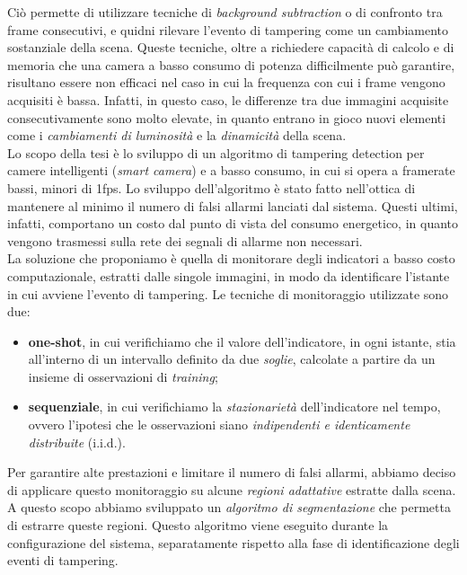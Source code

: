 Ci\`o permette di utilizzare tecniche di \textit{background subtraction} o di confronto tra frame consecutivi, e quidni rilevare l'evento di tampering come un cambiamento sostanziale della scena.
Queste tecniche, oltre a richiedere capacit\`a di calcolo e di memoria che una camera a basso consumo di potenza difficilmente pu\`o garantire, risultano essere non efficaci nel caso in cui la frequenza con cui i frame vengono acquisiti \`e bassa.
Infatti, in questo caso, le differenze tra due immagini acquisite consecutivamente sono molto elevate, in quanto entrano in gioco nuovi elementi come i \textit{cambiamenti di luminosit\`a} e la \textit{dinamicit\`a} della scena.\\
Lo scopo della tesi \`e lo sviluppo di un algoritmo di tampering detection per camere intelligenti (\textit{smart camera}) e a basso consumo, in cui si opera a framerate bassi, minori di 1fps.
Lo sviluppo dell'algoritmo \`e stato fatto nell'ottica di mantenere al minimo il numero di falsi allarmi lanciati dal sistema.
Questi ultimi, infatti, comportano un costo dal punto di vista del consumo energetico, in quanto vengono trasmessi sulla rete dei segnali di allarme non necessari.\\
La soluzione che proponiamo \`e quella di monitorare degli indicatori a basso costo computazionale, estratti dalle singole immagini, in modo da identificare l'istante in cui avviene l'evento di tampering.
Le tecniche di monitoraggio utilizzate sono due:
\begin{itemize}
	\item \textbf{one-shot}, in cui verifichiamo che il valore dell'indicatore, in ogni istante, stia all'interno di un intervallo definito da due \textit{soglie}, calcolate a partire da un insieme di osservazioni di \textit{training};
	\item \textbf{sequenziale}, in cui verifichiamo la \textit{stazionariet\`a} dell'indicatore nel tempo, ovvero l'ipotesi che le osservazioni siano \textit{indipendenti e identicamente distribuite} (i.i.d.).
\end{itemize}
Per garantire alte prestazioni e limitare il numero di falsi allarmi, abbiamo deciso di applicare questo monitoraggio su alcune \textit{regioni adattative} estratte dalla scena.
A questo scopo abbiamo sviluppato un \textit{algoritmo di segmentazione} che permetta di estrarre queste regioni.
Questo algoritmo viene eseguito durante la configurazione del sistema, separatamente rispetto alla fase di identificazione degli eventi di tampering.
